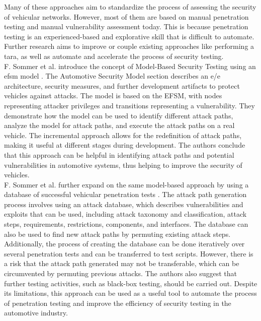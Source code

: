 Many of these approaches aim to standardize the process of assessing the security of vehicular networks. However, most of them are based on manual penetration testing and manual vulnerability assessment today. 
This is because penetration testing is an experienced-based and explorative skill that is difficult to automate. 
Further research aims to improve or couple existing approaches like performing a \acrshort{tara}, as well as automate and accelerate the process of security testing.\\

F. Sommer et al. introduce the concept of Model-Based Security Testing using an \acrshort{efsm} model \cite{model_based_testing}.
The Automotive Security Model section describes an \acrshort{e/e} architecture, security measures, and further development artifacts to protect vehicles against attacks.
The model is based on the EFSM, with nodes representing attacker privileges and transitions representing a vulnerability.
They demonstrate how the model can be used to identify different attack paths, analyze the model for attack paths, and execute the attack paths on a real vehicle. 
The incremental approach allows for the redefinition of attack paths, making it useful at different stages during development. 
The authors conclude that this approach can be helpful in identifying attack paths and potential vulnerabilities in automotive systems, thus helping to improve the security of vehicles.\\

F. Sommer et al. further expand on the same model-based approach by using a database of successful vehicular penetration tests \cite{attack_database}.
The attack path generation process involves using an attack database, which describes vulnerabilities and exploits that can be used, including attack taxonomy and classification, attack steps, requirements, restrictions, components, and interfaces. 
The database can also be used to find new attack paths by permuting existing attack steps. 
Additionally, the process of creating the database can be done iteratively over several penetration tests and can be transferred to test scripts. 
However, there is a risk that the attack path generated may not be transferable, which can be circumvented by permuting previous attacks. 
The authors also suggest that further testing activities, such as black-box testing, should be carried out. 
Despite its limitations, this approach can be used as a useful tool to automate the process of penetration testing and improve the efficiency of security testing in the automotive industry.\\

